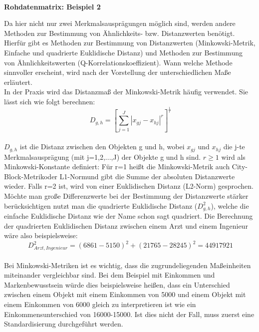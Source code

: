 \documentclass[12pt,titlepage]{article}
\begin{document}
\centerline{ \\
}
\centerline{\textbf{Rohdatenmatrix: Beispiel 2}}
\centerline{} 
Da hier nicht nur zwei Merkmalsausprägungen möglich sind, werden andere Methoden zur Bestimmung von Ähnlichkeits- bzw. Distanzwerten benötigt. Hierfür gibt es Methoden zur Bestimmung von Distanzwerten (Minkowski-Metrik, Einfache und quadrierte Euklidische Distanz) und Methoden zur Bestimmung von Ähnlichkeitswerten (Q-Korrelationskoeffizient). Wann welche Methode sinnvoller erscheint, wird nach der Vorstellung der unterschiedlichen Maße erläutert. \\
In der Praxis wird das Distanzmaß der Minkowski-Metrik häufig verwendet. Sie lässt sich wie folgt berechnen: \\
 \begin{equation}
  \ D_{g,h}=[\sum_{j=1}^{J} |x_{gj}-x_{hj}|^r ]^{\frac{1}{r}}
 \end{equation} \\ 
$D_{g,h}$ ist die Distanz zwischen den Objekten g und h, wobei $x_{gj}$ und $x_{hj}$ die j-te Merkmalsausprägung (mit j=1,2,...,J) der Objekte g und h sind. $r\geq 1$ wird als Minkowski-Konstante definiert: Für r=1 heißt die Minkowski-Metrik auch \glqq City-Block-Metrik\grqq oder \glqq L1-Norm\grqq und gibt die Summe der absoluten Distanzwerte wieder. Falls r=2 ist, wird von einer Euklidischen Distanz (L2-Norm) gesprochen. Möchte man große Differenzwerte bei der Bestimmung der Distanzwerte stärker berücksichtigen nutzt man die quadrierte Euklidische Distanz ($D_{g,h}^2$), welche die einfache Euklidische Distanz wie der Name schon sagt quadriert. Die Berechnung der quadrierten Euklidischen Distanz zwischen einem Arzt und einem Ingenieur wäre also beispielsweise:
 \begin{equation*}
  \ D_{Arzt,Ingenieur}^2= (6861-5150)^2 + (21765-28245)^2 = 44917921
 \end{equation*} \\
Bei Minkowski-Metriken ist es wichtig, dass die zugrundeliegenden Maßeinheiten miteinander vergleichbar sind. Bei dem Beispiel mit Einkommen und Markenbewusstsein würde dies beispielsweise heißen, dass ein Unterschied zwischen einem Objekt mit einem Einkommen von 5000 und einem Objekt mit einem Einkommen von 6000 gleich zu interpretieren ist wie ein Einkommensunterschied von 16000-15000. Ist dies nicht der Fall, muss zuerst eine Standardisierung durchgeführt werden. \\
\end{document}
